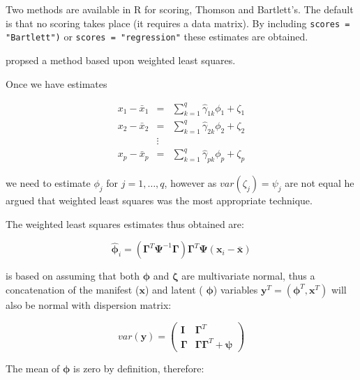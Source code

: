 Two methods are available in R for scoring, Thomson and Bartlett's.   The default is that no scoring takes place (it requires a data matrix).   By including \texttt{scores = "Bartlett")} or \texttt{scores = "regression"} these estimates are obtained.

\cite{Bartlett:1937,Bartlett:1938} propsed a method based upon weighted least squares.

Once we have estimates


\begin{eqnarray*}
x_{1} - \bar{x}_{1}  &=& \sum_{k=1}^{q} \hat{\gamma}_{1k} \phi_{1}  + \zeta_{1}\\
x_{2} - \bar{x}_{2} &=&  \sum_{k=1}^{q} \hat{\gamma}_{2k} \phi_{2}  + \zeta_{2}\\
&\vdots&\\
x_{p} - \bar{x}_{p} &=& \sum_{k=1}^{q} \hat{\gamma}_{pk} \phi_{p}  + \zeta_{p}
\end{eqnarray*}

we need to estimate $\phi_{j}$ for $j=1, \ldots, q$, however as $var(\zeta_{j}) = \psi_{j} $ are not equal he argued that weighted least squares was the most appropriate technique.

The weighted least squares estimates thus obtained are:

\begin{equation}
\boldsymbol{\hat{\phi}}_{i} = (\boldsymbol{\Gamma}^{T} \boldsymbol{\Psi}^{-1} \boldsymbol{\Gamma})\boldsymbol{\Gamma}^{T} \boldsymbol{\Psi}(\boldsymbol{x}_{i} - \boldsymbol{\bar{x}})
\end{equation}

\cite{Thomson:1951} is based on assuming that both $\boldsymbol{\phi}$ and $\boldsymbol{\zeta}$ are multivariate normal, thus a concatenation of the manifest ($\boldsymbol{x}$) and latent ( $\boldsymbol{\phi}$) variables $\boldsymbol{y}^{T} = (\boldsymbol{\phi}^{T}, \boldsymbol{x}^{T})$ will also be normal with dispersion matrix:

\begin{displaymath}
var(\boldsymbol{y}) = \left( \begin{array}{cc} \boldsymbol{I} & \boldsymbol{\Gamma}^{T} \\
\boldsymbol{\Gamma} & \boldsymbol{\Gamma} \boldsymbol{\Gamma}^{T} + \boldsymbol{\psi} \end{array} \right)
\end{displaymath}


The mean of $\boldsymbol{\phi}$ is zero by definition, therefore:

